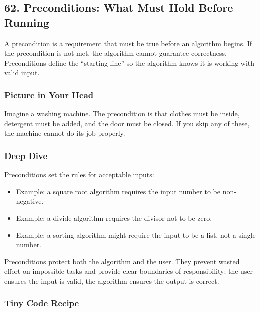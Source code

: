\documentclass[
  letterpaper,
  DIV=11,
  numbers=noendperiod]{scrreprt}
\providecommand{\tightlist}{%
  \setlength{\itemsep}{0pt}\setlength{\parskip}{0pt}}
\begin{document}
\subsection{62. Preconditions: What Must Hold Before
Running}\label{preconditions-what-must-hold-before-running}

A precondition is a requirement that must be true before an algorithm
begins. If the precondition is not met, the algorithm cannot guarantee
correctness. Preconditions define the ``starting line'' so the algorithm
knows it is working with valid input.

\subsubsection{Picture in Your Head}\label{picture-in-your-head-61}

Imagine a washing machine. The precondition is that clothes must be
inside, detergent must be added, and the door must be closed. If you
skip any of these, the machine cannot do its job properly.

\subsubsection{Deep Dive}\label{deep-dive-31}

Preconditions set the rules for acceptable inputs:

\begin{itemize}
\tightlist
\item
  Example: a square root algorithm requires the input number to be
  non-negative.
\item
  Example: a divide algorithm requires the divisor not to be zero.
\item
  Example: a sorting algorithm might require the input to be a list, not
  a single number.
\end{itemize}

Preconditions protect both the algorithm and the user. They prevent
wasted effort on impossible tasks and provide clear boundaries of
responsibility: the user ensures the input is valid, the algorithm
ensures the output is correct.

\subsubsection{Tiny Code Recipe}\label{tiny-code-recipe-59}
\end{document}
